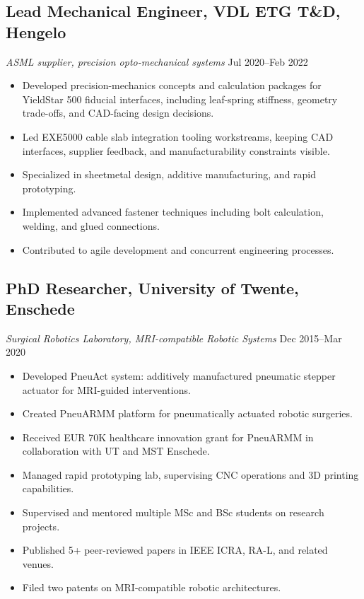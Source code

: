 \documentclass[11pt,a4paper]{article}
\begin{document}
\subsection{Lead Mechanical Engineer, VDL ETG T\&D, Hengelo}
{\small\textit{ASML supplier, precision opto-mechanical systems}} \hfill {\small Jul 2020--Feb 2022}
\begin{itemize}
 \item Developed precision-mechanics concepts and calculation packages for YieldStar 500 fiducial interfaces, including leaf-spring stiffness, geometry trade-offs, and CAD-facing design decisions.
 \item Led EXE5000 cable slab integration tooling workstreams, keeping CAD interfaces, supplier feedback, and manufacturability constraints visible.
 \item Specialized in sheetmetal design, additive manufacturing, and rapid prototyping.
 \item Implemented advanced fastener techniques including bolt calculation, welding, and glued connections.
 \item Contributed to agile development and concurrent engineering processes.
\end{itemize}

\subsection{PhD Researcher, University of Twente, Enschede}
{\small\textit{Surgical Robotics Laboratory, MRI-compatible Robotic Systems}} \hfill {\small Dec 2015--Mar 2020}
\begin{itemize}
 \item Developed PneuAct system: additively manufactured pneumatic stepper actuator for MRI-guided interventions.
 \item Created PneuARMM platform for pneumatically actuated robotic surgeries.
 \item Received EUR 70K healthcare innovation grant for PneuARMM in collaboration with UT and MST Enschede.
 \item Managed rapid prototyping lab, supervising CNC operations and 3D printing capabilities.
 \item Supervised and mentored multiple MSc and BSc students on research projects.
 \item Published 5+ peer-reviewed papers in IEEE ICRA, RA-L, and related venues.
 \item Filed two patents on MRI-compatible robotic architectures.
\end{itemize}
\end{document}
